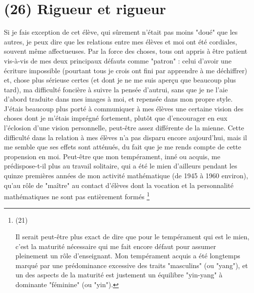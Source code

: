 \section{(26) Rigueur et rigueur}

Si je fais exception de cet élève, qui sûrement n'était pas moins "doué" que les autres, je peux dire que les relations entre mes élèves et moi ont été cordiales, souvent même affectueuses. Par la force des choses, tous ont appris à être patient vis-à-vis de mes deux principaux défauts comme "patron" : celui d'avoir une écriture impossible (pourtant tous je crois ont fini par apprendre à me déchiffrer) et, chose plus sérieuse certes (et dont je ne me suis aperçu que beaucoup plus tard), ma difficulté foncière à suivre la pensée d'autrui, sans que je ne l'aie d'abord traduite dans mes images à moi, et repensée dans mon propre style. J'étais beaucoup plus porté à communiquer à mes élèves une certaine vision des choses dont je m'étais imprégné fortement, plutôt que d'encourager en eux l'éclosion d'une vision personnelle, peut-être assez différente de la mienne. Cette difficulté dans la relation à mes élèves n'a pas disparu encore aujourd'hui, mais il me semble que ses effets sont atténués, du fait que je me rends compte de cette propension en moi. Peut-être que mon tempérament, inné ou acquis, me prédispose-t-il plus au travail solitaire, qui a été le mien d'ailleurs pendant les quinze premières années de mon activité mathématique (de 1945 à 1960 environ), qu'au rôle de "maître" au contact d'élèves dont la vocation et la personnalité mathématiques ne sont pas entièrement formés \footnote{(21)\par Il serait peut-être plus exact de dire que pour le tempérament qui est le mien, c'est la maturité nécessaire qui me fait encore défaut pour assumer pleinement un rôle d'enseignant. Mon tempérament acquis a été longtemps marqué par une prédominance excessive des traits "masculins" (ou "yang"), et un des aspects de la maturité est justement un équilibre "yin-yang" à dominante "féminine" (ou "yin"). 

}
